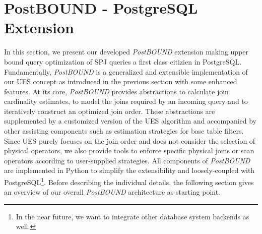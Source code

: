 \section{PostBOUND - PostgreSQL Extension}
\label{sec:PostBound}

In this section, we present our developed \emph{PostBOUND} extension making upper bound query optimization of SPJ queries a first class citizien in PostgreSQL. 
Fundamentally, \emph{PostBOUND} is a generalized and extensible implementation of our UES concept as introduced in the previous section with some enhanced features. 
At its core, \emph{PostBOUND} provides abstractions to calculate join cardinality estimates, to model the joins required by an incoming query and to iteratively construct an optimized join order.
These abstractions are supplemented by a customized version of the UES algorithm and accompanied by other assisting components such as estimation strategies for base table filters. 
Since UES purely focuses on the join order and does not consider the selection of physical operators, we also provide tools to enforce specific physical joins or scan operators according to user-supplied strategies. 
All components of \emph{PostBOUND} are implemented in Python to simplify the extensibility and loosely-coupled with PostgreSQL\footnote{In the near future, we want to integrate other database system backends as well.}.
Before describing the individual details, the following section gives an overview of our overall \emph{PostBOUND} architecture as starting point.





